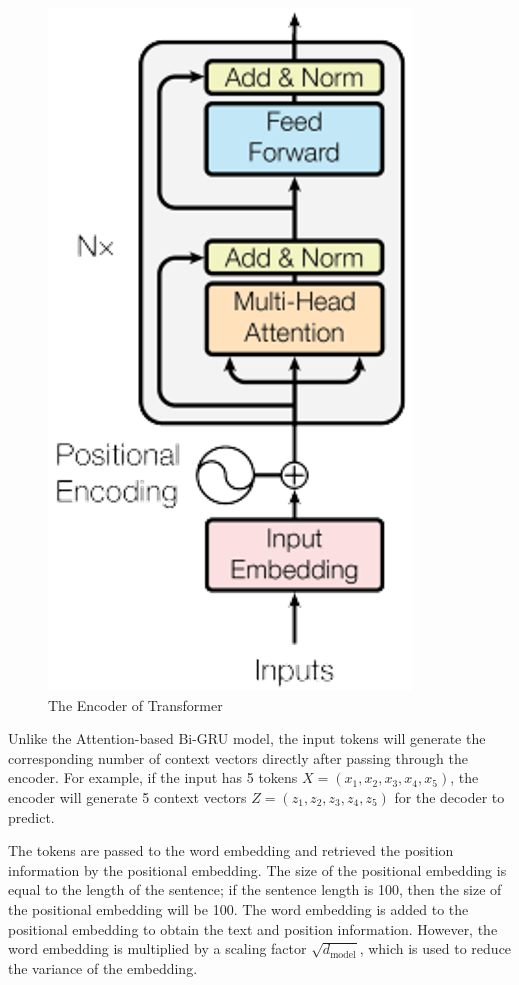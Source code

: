 \begin{figure}[h]
	\centering
	\includegraphics[scale=0.7]{../images/transformer-encoder.png}
    \caption{The Encoder of Transformer}
	\label{fig:transformer_encoder}
\end{figure}

Unlike the Attention-based Bi-GRU model, the input tokens will generate the corresponding number of context vectors directly after passing through the encoder. For example, if the input has 5 tokens $X = (x_1, x_2, x_3, x_4, x_5)$, the encoder will generate 5 context vectors $Z = (z_1, z_2, z_3, z_4, z_5)$ for the decoder to predict.

The tokens are passed to the word embedding and retrieved the position information by the positional embedding. The size of the positional embedding is equal to the length of the sentence; if the sentence length is 100, then the size of the positional embedding will be 100. The word embedding is added to the positional embedding to obtain the text and position information. However, the word embedding is multiplied by a scaling factor $\sqrt{d_\text{model}}$, which is used to reduce the variance of the embedding.

